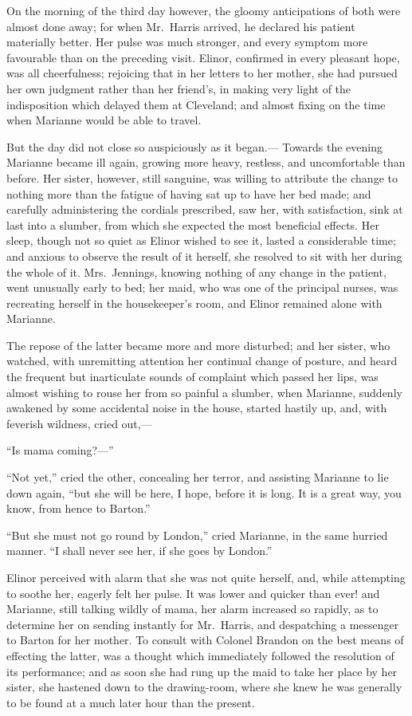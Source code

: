 On the morning of the third day however, the gloomy
anticipations of both were almost done away; for when
Mr.\ Harris arrived, he declared his patient materially better.
Her pulse was much stronger, and every symptom more favourable
than on the preceding visit.  Elinor, confirmed in every
pleasant hope, was all cheerfulness; rejoicing that
in her letters to her mother, she had pursued her own
judgment rather than her friend's, in making very light
of the indisposition which delayed them at Cleveland;
and almost fixing on the time when Marianne would be
able to travel.

But the day did not close so auspiciously as it began.---%
Towards the evening Marianne became ill again, growing
more heavy, restless, and uncomfortable than before.
Her sister, however, still sanguine, was willing to
attribute the change to nothing more than the fatigue
of having sat up to have her bed made; and carefully
administering the cordials prescribed, saw her, with
satisfaction, sink at last into a slumber, from which
she expected the most beneficial effects.  Her sleep,
though not so quiet as Elinor wished to see it,
lasted a considerable time; and anxious to observe
the result of it herself, she resolved to sit with her
during the whole of it.  Mrs.\ Jennings, knowing nothing
of any change in the patient, went unusually early to bed;
her maid, who was one of the principal nurses, was recreating
herself in the housekeeper's room, and Elinor remained
alone with Marianne.

The repose of the latter became more and more disturbed;
and her sister, who watched, with unremitting attention
her continual change of posture, and heard the frequent
but inarticulate sounds of complaint which passed her lips,
was almost wishing to rouse her from so painful a slumber,
when Marianne, suddenly awakened by some accidental noise
in the house, started hastily up, and, with feverish wildness,
cried out,---%

``Is mama coming?---''

``Not yet,'' cried the other, concealing her terror,
and assisting Marianne to lie down again, ``but she will
be here, I hope, before it is long.  It is a great way,
you know, from hence to Barton.''

``But she must not go round by London,'' cried Marianne,
in the same hurried manner.  ``I shall never see her,
if she goes by London.''

Elinor perceived with alarm that she was not
quite herself, and, while attempting to soothe her,
eagerly felt her pulse.  It was lower and quicker than ever!
and Marianne, still talking wildly of mama, her alarm
increased so rapidly, as to determine her on sending
instantly for Mr.\ Harris, and despatching a messenger
to Barton for her mother.  To consult with Colonel Brandon
on the best means of effecting the latter, was a thought
which immediately followed the resolution of its performance;
and as soon she had rung up the maid to take her place
by her sister, she hastened down to the drawing-room,
where she knew he was generally to be found at a much
later hour than the present.

